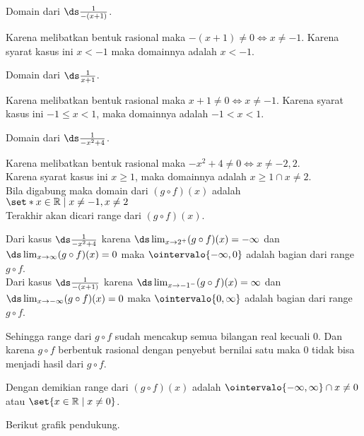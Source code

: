 \begin{enumerate}[leftmargin=*, label={\arabic*}.]
\begin{enumerate}[label={\alph*}.]
Domain dari $\ds \frac{1}{-(x+1)}$.

Karena melibatkan bentuk rasional maka $-(x+1) \neq 0 \iff x \neq -1$. Karena 
syarat kasus ini $x < -1$ maka domainnya adalah $x < -1$.

Domain dari $\ds \frac{1}{x+1}$.

Karena melibatkan bentuk rasional maka $x+1 \neq 0 \iff x \neq -1$. Karena 
syarat kasus ini $-1 \leq x < 1$, maka domainnya adalah $-1 < x < 1$.

Domain dari $\ds \frac{1}{-x^{2}+4}$.

Karena melibatkan bentuk rasional maka $-x^{2}+4 \neq 0 \iff x \neq -2,2$.\\
Karena syarat kasus ini $x \geq 1$, maka domainnya adalah $x \geq 1 \cap x \neq 2$.\\
Bila digabung maka domain dari $(g \circ f)(x)$ adalah 
$\set*{x \in \mathbb{R} \mid x \neq -1, x\neq 2}$ \\

Terakhir akan dicari range dari $(g \circ f)(x)$.

Dari kasus $\ds \frac{1}{-x^{2}+4}$ 
karena $\ds \lim_{x\to 2^{+}} (g \circ f)(x) = -\infty$ dan 
$\ds \lim_{x\to \infty} (g \circ f)(x) = 0$ maka 
$\ointervalo{-\infty,0}$ adalah bagian dari range $g \circ f$.\\
Dari kasus $\ds \frac{1}{-(x+1)}$ 
karena $\ds \lim_{x\to -1^{-}} (g \circ f)(x) = \infty$ dan 
$\ds \lim_{x\to -\infty} (g \circ f)(x) = 0$ maka 
$\ointervalo{0,\infty}$ adalah bagian dari range $g \circ f$.

Sehingga range dari $g \circ f$ sudah mencakup semua bilangan real kecuali $0$.
Dan karena $g \circ f$ berbentuk rasional dengan penyebut bernilai satu maka $0$ 
tidak bisa menjadi hasil dari $g \circ f$.

Dengan demikian range dari $(g \circ f)(x)$ adalah $\ointervalo{-\infty,\infty} \cap x \neq 0$ 
atau $\set{x \in \mathbb{R} \mid x \neq 0}$.

Berikut grafik pendukung.

\begin{center}
\end{center}


\end{enumerate}
\end{enumerate}
